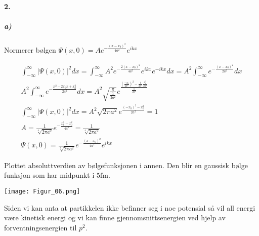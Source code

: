 \documentclass[11pt, A4paper,norsk]{article}
\begin{document}
		\paragraph{2.}
			\subparagraph{a)}
				\begin{flushleft}
Normerer bølgen $\Psi(x, 0) = A e^{- \frac{(x - x_0)^2}{4a^2}} e^{ikx}$
				\end{flushleft}
				\begin{gather*}
\int_{- \infty}^{\infty} |\Psi(x, 0)|^2 dx = \int_{- \infty}^{\infty} A^2 e^{- \frac{2 (x - x_0)^2}{4a^2}} e^{ikx} e^{- ikx} dx = A^2 \int_{- \infty}^{\infty} e^{- \frac{(x - x_0)^2}{2a^2}} dx \\
A^2 \int_{- \infty}^{\infty} e^{- \frac{x^2 - 2 x_0 x + x_0^2}{2a^2}} dx = A^2 \sqrt{\frac{\pi}{\frac{1}{2a^2}}} e^{\frac{\left( \frac{- x_0}{2 a^2} \right)^2 - \frac{1}{2a^2} \frac{x_0^2}{2a^2}}{\frac{1}{2a^2}}} \\
\int_{- \infty}^{\infty} |\Psi(x, 0)|^2 dx = A^2 \sqrt{2 \pi a^2} e^{\frac{\left( - x_0 \right)^2 - x_0^2}{2a^2}} = 1 \\
A = \frac{1}{\sqrt[4]{2 \pi a^2}} e^{- \frac{x_0^2 - x_0^2}{4a^2}} = \frac{1}{\sqrt[4]{2 \pi a^2}} \\
\Psi(x, 0) = \frac{1}{\sqrt[4]{2 \pi a^2}} e^{- \frac{(x - x_0)^2}{4a^2}} e^{ikx}
				\end{gather*}
				\begin{flushleft}
Plottet absoluttverdien av bølgefunksjonen i annen. Den blir en gaussisk bølge funksjon som har midpunkt i $5 \text{fm}$.
				\end{flushleft}
\texttt{[image: Figur\_06.png]}

				\begin{flushleft}
Siden vi kan anta at partikkelen ikke befinner seg i noe potensial så vil all energi være kinetisk energi og vi kan finne gjennomsnittsenergien ved hjelp av forventningsenergien til $p^2$.
				\end{flushleft}
\end{document}
